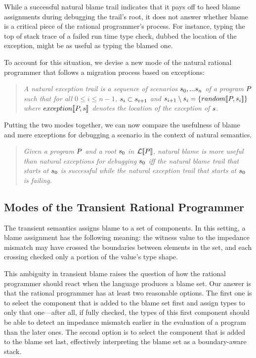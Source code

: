 While a successful natural blame trail indicates that it 
pays off to heed blame assignments during debugging the trail's root, it does not answer whether
blame is a critical piece of the rational programmer's process.  For instance,
typing the top of stack trace of a failed run time type check, dubbed the
location of the exception, might be as useful as typing the blamed one.

To account for this situation, we devise a new mode of the natural rational
programmer that follows a migration process based on exceptions:
\begin{quote}
\it A natural exception trail is a sequence of scenarios $s_0,...s_n$ of a
program $P$ such that for all $0 \leq i \leq n - 1$, $s_i \subset
s_{i+1}$ and $s_{i+1} \setminus s_i = \{random\llbracket P, s_i\rrbracket\}$
where $exception\llbracket P, s\rrbracket$ denotes the location of the exception of $s$.
\end{quote}

Putting the two modes together, we can now compare the usefulness of blame 
and mere exceptions for debugging a scenario in the context of natural semantics.
\begin{quote}
\it 
  Given a program $P$ and a root $s_0$ in $\mathcal{L}\llbracket P\rrbracket$,
  natural blame is \emph{more useful} than natural exceptions for
  debugging $s_0$ iff 
  the natural blame trail 
  that starts at $s_0$ is successful while the natural exception trail that
  starts at $s_0$ is failing.
\end{quote}

\subsection{Modes of the Transient Rational Programmer} \label{sub:transient}

The transient semantics assigns blame to a set of components. In this setting, a
blame assignment has the following meaning: the witness value to the impedance
mismatch may have crossed the boundaries between elements in the set, and each crossing
checked only a portion of the value's type shape. 

This ambiguity in transient blame raises the question of how the rational programmer
should react when the language produces a blame set. Our answer is that the rational
programmer has at least two reasonable options. The first one is to select the component that is added
to the blame set first and assign types to only that one---after all, if
fully checked, the types of
this first component should be able to detect an impedance mismatch earlier in the
evaluation of a program than the later ones. The second option is to
select the component that is added to the blame set last, effectively
interpreting the blame set as a boundary-aware stack. 

